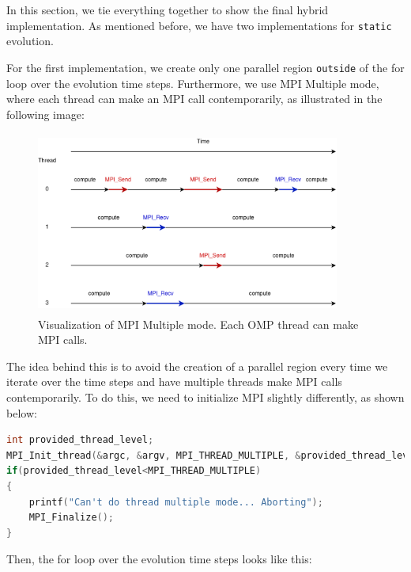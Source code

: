\documentclass{report}
\begin{document}
In this section, we tie everything together to show the final hybrid implementation. 
As mentioned before, we have two implementations for \texttt{static} evolution.

For the first implementation, we create only one parallel region \texttt{outside} 
of the for loop over the evolution time steps. Furthermore, we use MPI Multiple 
mode, where each thread can make an MPI call contemporarily, as illustrated in the 
following image:

\begin{figure}[H]
    \centering
    \includegraphics[width=10cm, height=6cm]{./other_images/mpi_multiple.png}
    \caption{\label{fig:mpi_multiple} Visualization of MPI Multiple mode. Each OMP 
    thread can make MPI calls.}
\end{figure}

The idea behind this is to avoid the creation of a parallel region every time 
we iterate over the time steps and have multiple threads make MPI calls contemporarily. 
To do this, we need to initialize MPI slightly differently, as shown below:

\begin{lstlisting}[language=C++]
int provided_thread_level;
MPI_Init_thread(&argc, &argv, MPI_THREAD_MULTIPLE, &provided_thread_level);
if(provided_thread_level<MPI_THREAD_MULTIPLE)
{
    printf("Can't do thread multiple mode... Aborting");
    MPI_Finalize();
}
\end{lstlisting}

Then, the for loop over the evolution time steps looks like this:
\end{document}
